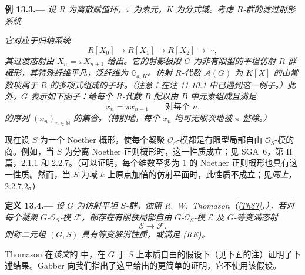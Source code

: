 \medskip
{}\label{ex:sga3-VIB-13.3}%
\noindent\textbf{例 13.3.---}
\emph{设 \(R\) 为离散赋值环，\(\pi\) 为素元，\(K\) 为分式域。考虑 \(R\)-群的滤过射影系统}
\begin{center}
  \label{diag:sga3-VIB-13.3-projective-system}%
\end{center}
\emph{它对应于归纳系统}
\[
  R[X_0]\longrightarrow R[X_1]\longrightarrow R[X_2]
    \longrightarrow\cdots,
\]
\emph{其过渡态射由 \(X_n=\pi X_{n+1}\) 给出。它的射影极限 \(G\) 为非有限型的平坦仿射 \(R\)-群概形，其特殊纤维平凡，泛纤维为 \(\mathbb G_{a,K}\)。仿射 \(R\)-代数 \(\mathcal A(G)\) 为 \(K[X]\) 的由常数项属于 \(R\) 的多项式组成的子环。\textup{（注意：在\hyperref[rem:sga3-VIB-11.10.1]{注 11.10.1} 中已遇到这一例子。）}此外，\(G\) 表示如下函子：给每个 \(R\)-代数 \(B\) 配以由 \(B\) 中元素组成且满足}
\[
  x_n=\pi x_{n+1}\qquad\text{对每个 \(n\)}.
\]
\emph{的序列 \((x_n)_{n\in\mathbb N}\) 的集合。\textup{（特别地，每个 \(x_n\) 均可无限次地被 \(\pi\) 整除。）}}

现在设 \(S\) 为一个 Noether 概形，使每个凝聚 \(\mathcal O_S\)-模都是有限型局部自由 \(\mathcal O_S\)-模的商。例如，当 \(S\) 为分离 Noether 正则概形时，这一性质成立；见 SGA~6，第 II 篇，2.1.1 和 2.2.7。\textup{（可以证明，每个维数至多为 \(1\) 的 Noether 正则概形也具有这一性质。然而，当 \(S\) 为域 \(k\) 上原点加倍的仿射平面时，此性质不成立；见\emph{同上}，2.2.7.2。）}

\medskip
{}\label{def:sga3-VIB-13.4}%
\noindent\textbf{定义 13.4.---}
\emph{设 \(G\) 为仿射平坦 \(S\)-群。依照 R.~W.~Thomason\textup{（\hyperref[bib:sga3-VIB-Th87]{[Th87]}，）}，若对每个凝聚 \(G\)-\(\mathcal O_S\)-模 \(\mathcal F\)，都存在有限秩局部自由 \(G\)-\(\mathcal O_S\)-模 \(\mathcal E\) 及 \(G\)-等变满态射}
\[
  \mathcal E\longrightarrow\mathcal F.
\]
\emph{则称二元组 \((G,S)\) 具有\emph{等变解消性质}，或满足 \textup{(RE)}。}

Thomason 在\emph{该文}的 中，在 \(G\) 于 \(S\) 上本质自由的假设下\textup{（见下面的注）}证明了下述结果。Gabber 向我们指出了这里给出的更简单的证明，它不使用该假设。


